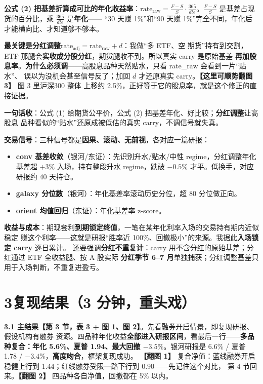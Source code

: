 \documentclass[11pt]{ctexart}
\newcommand{\cue}[1]{{\color{cue}\textbf{【#1】}}}
\begin{document}
\textbf{公式 (2) 把基差折算成可比的年化收益率}：$\text{rate}_{\text{raw}}=\frac{F-S}{S}\cdot
\frac{365}{dte}$。$\frac{F-S}{S}$ 是基差占现货的百分比，乘 $\frac{365}{dte}$ 是\textbf{年化}——
``30 天赚 1\%''和``90 天赚 1\%''完全不同，年化后才能横向比、才知道够不够本。

\textbf{最关键是分红调整}$\text{rate}_{\text{adj}}=\text{rate}_{\text{raw}}+d$：我做``多 ETF、空
期货''持有到交割，ETF 那腿会\textbf{实收成分股分红}，期货腿收不到。所以真实 carry 是原始基差
\textbf{再加股息率}。\textbf{为什么必须调}——高股息品种天然贴水，只看 rate\_raw 会看到一片``贴水''、
误以为没机会甚至信号反了；加回 $d$ 才还原真实 carry。\cue{这里可顺势翻图 3} 图 3 里沪深300 整体
上移约 2.5\%，正好等于它的股息率，就是这个修正的直接证据。

\textbf{一句话收}：公式 (1) 给期货公平价，公式 (2) 把基差年化、好比较；\textbf{分红调整}让高股息
品种看似的``贴水''还原成被低估的真实 carry，不调信号就失真。

\textbf{交易信号}：三种信号都是\textbf{因果、滚动、无前视}，各对应一篇研报：
\begin{itemize}
  \item \textbf{conv 基差收敛}（银河/东证）：先识别升水/贴水/中性 regime，分红调整年化基差超
        $+3\%$ 入场，持有整段升水 regime，跌破 $-0.5\%$ 才平。低换手，对应研报约 40 天持仓。
  \item \textbf{galaxy 分位数}（银河）：年化基差率滚动历史分位，超 80 分位做正向。
  \item \textbf{orient 均值回归}（东证）：年化基差率 z-score。
\end{itemize}

\textbf{收益与成本}：期现套利\textbf{到期锁定终值}，一笔在某年化利率入场的交易持有期内近似稳定
赚这个利率——这就是研报``胜率近 100\%、回撤极小''的来源。我据此\textbf{入场锁定 carry} 逐日累计。
还要强调\textbf{分红不重复计}：carry 用不含分红的原始基差；分红通过 ETF 全收益腿、按 A 股实际
\textbf{分红季节 6--7 月}单独捕获；分红调整基差只用于入场判断，不重复进盈亏。

\section*{3\quad 复现结果（3 分钟，重头戏）}

\textbf{3.1 主结果}\cue{第 3 节，表 3 + 图 1、图 2}。先看融券开启情景，即复现研报、假设机构有融券
资源。四品种年化收益\textbf{全部进入研报区间}，看最后一行——\textbf{多品种复合：年化 5.6\%、夏普
1.94、最大回撤 $-3.5\%$}。银河研报是 6.6\% / 夏普 1.78 / $-3.4\%$，\textbf{高度吻合}，框架复现成功。
\cue{翻图 1} 复合净值：蓝线融券开启稳健上行到 1.44；红线融券受限一路下行到 0.90——先记住这个对比，
第 4 节回来。\cue{翻图 2} 四品种各自净值，回撤都在 5\% 以内。
\end{document}
